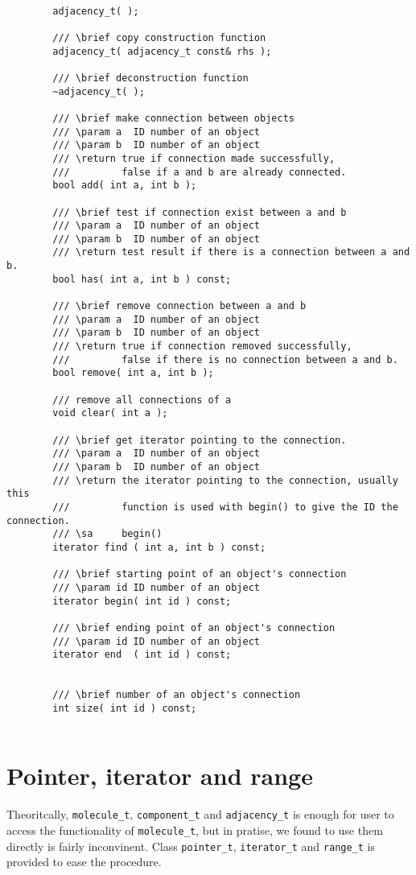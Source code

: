 \documentclass[letterpaper]{book}
\begin{document}
\begin{lstlisting}

        adjacency_t( );

        /// \brief copy construction function 
        adjacency_t( adjacency_t const& rhs );
        
        /// \brief deconstruction function
        ~adjacency_t( );
        
        /// \brief make connection between objects
        /// \param a  ID number of an object
        /// \param b  ID number of an object
        /// \return true if connection made successfully, 
        ///         false if a and b are already connected.
        bool add( int a, int b );

        /// \brief test if connection exist between a and b
        /// \param a  ID number of an object
        /// \param b  ID number of an object
        /// \return test result if there is a connection between a and b.
        bool has( int a, int b ) const;
        
        /// \brief remove connection between a and b
        /// \param a  ID number of an object
        /// \param b  ID number of an object
        /// \return true if connection removed successfully, 
        ///         false if there is no connection between a and b.
        bool remove( int a, int b );

        /// remove all connections of a
        void clear( int a );

        /// \brief get iterator pointing to the connection.
        /// \param a  ID number of an object
        /// \param b  ID number of an object
        /// \return the iterator pointing to the connection, usually this 
        ///         function is used with begin() to give the ID the connection.
        /// \sa     begin()
        iterator find ( int a, int b ) const;

        /// \brief starting point of an object's connection
        /// \param id ID number of an object
        iterator begin( int id ) const;
        
        /// \brief ending point of an object's connection
        /// \param id ID number of an object
        iterator end  ( int id ) const;


        /// \brief number of an object's connection
        int size( int id ) const;


\end{lstlisting}

\section{Pointer, iterator and range}
   Theoritcally, \lstinline$molecule_t$, \lstinline$component_t$ and \lstinline$adjacency_t$ is
enough for user to access the functionality of \lstinline$molecule_t$, but in pratise, we found
to use them directly is fairly inconvinent. Class \lstinline$pointer_t$, \lstinline$iterator_t$
and \lstinline$range_t$ is provided to ease the procedure.
\end{document}
